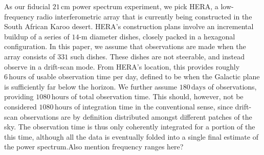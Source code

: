 \documentclass[twocolumn,aps,prd,nofootinbib,showpacs]{revtex4-1}
\begin{document}
As our fiducial $21\,\textrm{cm}$ power spectrum experiment, we pick HERA, a low-frequency radio interferometric array that is currently being constructed in the South African Karoo desert. HERA's construction plans involve an incremental buildup of a series of $14$-m diameter dishes, closely packed in a hexagonal configuration. In this paper, we assume that observations are made when the array consists of $331$ such dishes. These dishes are not steerable, and instead observe in a drift-scan mode. From HERA's location, this provides roughly $6\,\textrm{hours}$ of usable observation time per day, defined to be when the Galactic plane is sufficiently far below the horizon. We further assume $180\,\textrm{days}$ of observations, providing $1080\,\textrm{hours}$ of total observation time. This should, however, not be considered $1080\,\textrm{hours}$ of integration time in the conventional sense, since drift-scan observations are by definition distributed amongst different patches of the sky. The observation time is thus only coherently integrated for a portion of the this time, although all the data is eventually folded into a single final estimate of the power spectrum.\acl{Also mention frequency ranges here?}
\end{document}

